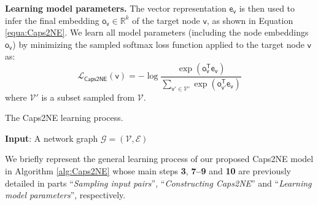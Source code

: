 \documentclass[sigconf]{acmart}
\begin{document}
 
\textbf{Learning model parameters.} The vector representation  $\boldsymbol{\mathsf{e}}_{\mathsf{v}}$ is then used to infer the final embedding $\boldsymbol{\mathsf{o}}_{\mathsf{v}} \in \mathbb{R}^{k}$ of the target node $\mathsf{v}$, as shown in Equation \ref{equa:Caps2NE}.
We learn all model parameters (including the node embeddings $\boldsymbol{\mathsf{o}}_{\mathsf{v}}$) by minimizing the sampled softmax loss function \citep{Jean2015} applied to the target node $\mathsf{v}$ as:
\begin{equation}
\mathcal{L}_{\mathsf{Caps2NE}}\left(\mathsf{v}\right) = -\log \frac{\exp(\boldsymbol{\mathsf{o}}_\mathsf{v}^\mathsf{T} \boldsymbol{\mathsf{e}}_{\mathsf{v}})}{\sum_{\mathsf{v'} \in \mathcal{V'}} \exp(\boldsymbol{\mathsf{o}}_\mathsf{v'}^\mathsf{T} \boldsymbol{\mathsf{e}}_{\mathsf{v}})} \label{equa:Caps2NE}
\end{equation}
\noindent where $\mathcal{V'}$ is a subset sampled from $\mathcal{V}$.

\begin{algorithm}
\caption{The Caps2NE learning process.}
\label{alg:Caps2NE}
{
\DontPrintSemicolon
\SetAlgoVlined
\textbf{Input}: A network graph $\mathcal{G} = (\mathcal{V}, \mathcal{E})$



}
\end{algorithm}


We briefly  represent the general learning process of our proposed Caps2NE model in Algorithm \ref{alg:Caps2NE} whose main steps \textbf{3}, \textbf{7--9} and \textbf{10} are previously detailed in parts ``\textit{Sampling input pairs}'', ``\textit{Constructing Caps2NE}'' and ``\textit{Learning model parameters}'', respectively. 
\end{document}
